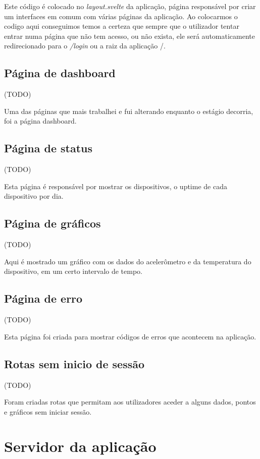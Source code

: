 Este código é colocado no \textit{layout.svelte} da aplicação, página responsável por criar um interfaces em comum com várias páginas da aplicação. Ao colocarmos o codigo aqui conseguimos temos a certeza que sempre que o utilizador tentar entrar numa página que não tem acesso, ou não exista, ele será automaticamente redirecionado para o \textit{/login} ou a raiz da aplicação /. 

\subsection{Página de dashboard}
(TODO)

Uma das páginas que mais trabalhei e fui alterando enquanto o estágio decorria, foi a página dashboard.

\clearpage
\subsection{Página de status}
(TODO)

Esta página é responsável por mostrar os dispositivos, o uptime de cada dispositivo por dia. 

\clearpage
\subsection{Página de gráficos}
(TODO)

Aqui é mostrado um gráfico com os dados do acelerômetro e da temperatura do dispositivo, em um certo intervalo de tempo.

\clearpage
\subsection{Página de erro}
(TODO)

Esta página foi criada para mostrar códigos de erros que acontecem na aplicação.

\clearpage
\subsection{Rotas sem inicio de sessão}
(TODO)

Foram criadas rotas que permitam aos utilizadores aceder a alguns dados, pontos e gráficos sem iniciar sessão.

\clearpage
\section{Servidor da aplicação}

